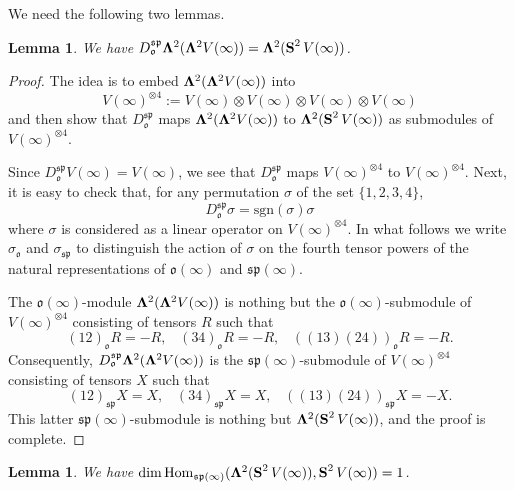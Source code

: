\documentclass{emsprocart}
\newtheorem{lemma}[theorem]{Lemma}
\begin{document}
We need the following two lemmas.
\begin{lemma}\label{L75}We have $D_{\mathfrak o}^{\mathfrak{sp}}{\bf \Lambda}^2({\bf \Lambda}^2V(\infty))={\bf \Lambda}^2(\operatorname{\bf S}^2V(\infty))$.\end{lemma}
\begin{proof} The idea is to embed ${\bf \Lambda}^2({\bf \Lambda}^2V(\infty))$ into $$V(\infty)^{\otimes 4}:=V(\infty)\otimes V(\infty)\otimes V(\infty)\otimes V(\infty)$$ and then show that $D_{\mathfrak o}^{\mathfrak{sp}}$ maps ${\bf \Lambda}^2({\bf \Lambda}^2V(\infty))$ to ${\bf \Lambda}^2(\operatorname{\bf S}^2V(\infty))$ as submodules of $V(\infty)^{\otimes 4}$.

Since $D_\mathfrak o^{\mathfrak{sp}}V(\infty)=V(\infty)$, we see that $D_\mathfrak o^{\mathfrak{sp}}$ maps $V(\infty)^{\otimes 4}$ to $V(\infty)^{\otimes 4}$. Next, it is easy to check that, for any permutation $\sigma$ of the set $\{1, 2, 3, 4\}$,
$$D_{\mathfrak o}^{\mathfrak{sp}}\sigma=\mbox{sgn}(\sigma)\sigma$$ where $\sigma$ is considered as a linear operator on $V(\infty)^{\otimes 4}$. In what follows we write $\sigma_{\mathfrak o}$ and $\sigma_{\mathfrak{sp}}$ to distinguish the action of $\sigma$ on the fourth tensor powers of the natural representations of $\mathfrak{o}(\infty)$ and $\mathfrak{sp}(\infty)$.

The $\mathfrak o(\infty)$-module ${\bf \Lambda}^2({\bf \Lambda}^2V(\infty))$ is nothing but the $\mathfrak o(\infty)$-submodule of $V(\infty)^{\otimes 4}$ consisting of tensors $R$ such that
$$(12)_{\mathfrak o}R=-R,\hspace{10pt}(34)_{\mathfrak o}R=-R,\hspace{10pt}((13)(24))_{\mathfrak o}R=-R.$$
Consequently, $D_\mathfrak o^{\mathfrak{sp}}{\bf \Lambda}^2({\bf \Lambda}^2V(\infty))$ is the $\mathfrak{sp}(\infty)$-submodule of $V(\infty)^{\otimes 4}$ consisting of tensors $X$ such that
$$(12)_{\mathfrak{sp}}X=X,\hspace{10pt}(34)_{\mathfrak{sp}}X=X,\hspace{10pt}((13)(24))_{\mathfrak{sp}}X=-X.$$
This latter $\mathfrak{sp}(\infty)$-submodule is nothing but ${\bf \Lambda}^2(\operatorname{\bf S}^2V(\infty))$, and the proof is complete.\end{proof}
\begin{lemma}\label{Lhom}We have $\dim\operatorname{Hom}_{\mathfrak{sp}(\infty)}({\bf \Lambda}^2(\operatorname{\bf S}^2V(\infty)), \operatorname{\bf S}^2V(\infty))=1$.\end{lemma}
\end{document}
